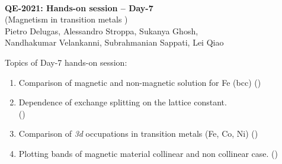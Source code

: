 \documentclass[landscape]{foils}
\begin{document}

\blue
~\\
\vspace*{4cm}
\MyLogo{~}
\vspace{5em}
\begin{center}
  {\burgundy\LARGE\bf QE-2021: Hands-on session -- Day-7}\\[2em]
  {\burgundy\LARGE (Magnetism in transition metals )}
  ~\\[1.5em]  
  \large Pietro Delugas, Alessandro Stroppa, Sukanya Ghosh, \\
	Nandhakumar Velankanni, Subrahmanian Sappati, Lei Qiao\\
  
\end{center}

Topics of Day-7 hands-on session:
\begin{enumerate}
	\item Comparison of magnetic and non-magnetic solution for Fe (bcc) ()
	\item Dependence of exchange splitting on the lattice constant. \\ ()  
	\item Comparison of \emph{3d} occupations in transition metals (Fe, Co, Ni) ()  
	\item Plotting bands of magnetic material collinear and non collinear case. () 
\end{enumerate}
   
\end{document}
